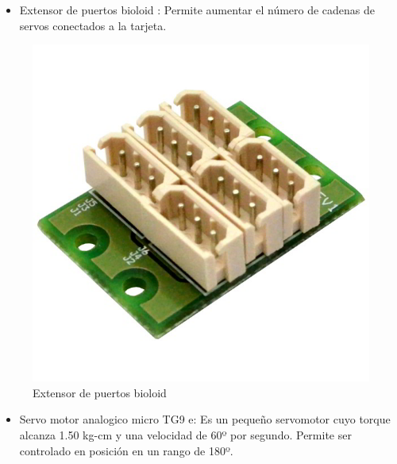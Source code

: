 \begin{itemize}
\item Extensor de puertos bioloid : Permite aumentar el número de cadenas de servos conectados a la tarjeta. 


\end{itemize}


\begin{figure}[hbtp]
\caption{Extensor de puertos bioloid  }
\centering
\includegraphics[scale=0.3]{imagenes/Dynamixel-AX-MX-6-Port-Extension-Hub-600x600.jpg}
\end{figure}


\begin{itemize}
\item Servo motor analogico micro TG9 e: Es un pequeño servomotor cuyo torque alcanza 1.50 kg-cm y una velocidad de 60º por segundo. Permite ser controlado en posición en un rango de 180º. 


\end{itemize}


